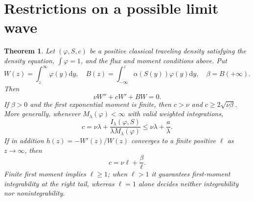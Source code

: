 \documentclass[11pt]{article}
\newtheorem{theorem}{Theorem}
\newcommand{\dd}{\mathrm d}
\begin{document}
\section{Restrictions on a possible limit wave}
\begin{theorem}\label{waves}
Let $(\varphi,S,c)$ be a positive classical traveling density satisfying the density equation, $\int\varphi=1$, and the flux and moment conditions above. Put
\[
 W(z)=\int_z^\infty\varphi(y)\dd y,\quad
 B(z)=\int_{-\infty}^z\alpha(S(y))\varphi(y)\dd y,\quad
 \beta=B(+\infty).
\]
Then
\begin{equation}\label{tailode}
 \nu W''+cW'+BW=0.
\end{equation}
If $\beta>0$ and the first exponential moment is finite, then $c>\nu$ and
$c\ge2\sqrt{\nu\beta}$. More generally, whenever $M_\lambda(\varphi)<\infty$ with valid weighted integrations,
\begin{equation}\label{speedmoment}
 c=\nu\lambda+\frac{I_\lambda(\varphi,S)}{\lambda M_\lambda(\varphi)}
 \le\nu\lambda+\frac a\lambda.
\end{equation}
If in addition $h(z)=-W'(z)/W(z)$ converges to a finite positive $\ell$ as $z\to\infty$, then
\begin{equation}\label{dispersion}
 c=\nu\ell+\frac\beta\ell.
\end{equation}
Finite first moment implies $\ell\ge1$; when $\ell>1$ it guarantees first-moment integrability at the right tail, whereas $\ell=1$ alone decides neither integrability nor nonintegrability.
\end{theorem}
\end{document}
